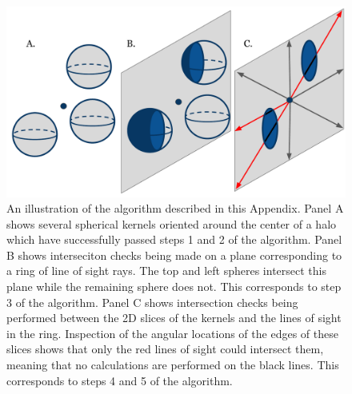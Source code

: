 \documentclass[numberedappendix,apj]{emulateapj}
\begin{document}
\begin{figure}
\centering
\includegraphics[width=\columnwidth]{intr_algo.pdf}
\caption{An illustration of the algorithm described in this Appendix. Panel A
         shows several spherical kernels oriented around the center of a halo
         which have successfully passed steps 1 and 2 of the algorithm. Panel B
         shows interseciton checks being made on a plane corresponding to a
         ring of line of sight rays. The top and left spheres intersect this
         plane while the remaining sphere does not. This corresponds to step
         3 of the algorithm. Panel C shows intersection checks being performed
         between the 2D slices of the kernels and the lines of sight in the
         ring. Inspection of the angular locations of the edges of these slices
         shows that only the red lines of sight could intersect
         them, meaning that no calculations are performed on the black lines.
         This corresponds to steps 4 and 5 of the algorithm.}
           
\label{fig:intr_algo} 
\end{figure}
\end{document}
